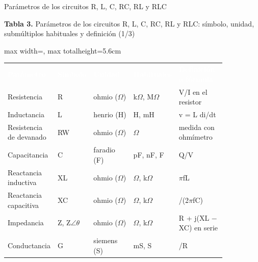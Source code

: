 \documentclass[aspectratio=169,11pt,xcolor={table}]{beamer}
\begin{document}
\begin{frame}{Parámetros de los circuitos R, L, C, RC, RL y RLC}
\begin{center}
{\scriptsize\textbf{Tabla 3.} Parámetros de los circuitos R, L, C, RC, RL y RLC: símbolo, unidad, submúltiplos habituales y definición (1/3)\par}
\vspace{1mm}
\scriptsize
\renewcommand{\arraystretch}{1.35}
\begin{adjustbox}{max width=\linewidth, max totalheight=5.6cm}
\begin{tabular}{>{\raggedright\arraybackslash}p{0.206\linewidth}>{\raggedright\arraybackslash}p{0.074\linewidth}>{\raggedright\arraybackslash}p{0.223\linewidth}>{\raggedright\arraybackslash}p{0.099\linewidth}>{\raggedright\arraybackslash}p{0.247\linewidth}}
\rowcolor{iubnavy} \textcolor{white}{\textbf{Parámetro}} & \textcolor{white}{\textbf{Símbolo}} & \textcolor{white}{\textbf{Unidad}} & \textcolor{white}{\textbf{Habituales}} & \textcolor{white}{\textbf{Definición o fórmula}} \\
Resistencia & R & ohmio (\ensuremath{\Omega}) & k\ensuremath{\Omega}, M\ensuremath{\Omega} & V/I en el resistor \\
\rowcolor{iubfondogris} Inductancia & L & henrio (H) & \textmu{}H, mH & v = L di/dt \\
Resistencia de devanado & RW & ohmio (\ensuremath{\Omega}) & \ensuremath{\Omega} & medida con ohmímetro \\
\rowcolor{iubfondogris} Capacitancia & C & faradio (F) & pF, nF, \textmu{}F & Q/V \\
Reactancia inductiva & XL & ohmio (\ensuremath{\Omega}) & \ensuremath{\Omega}, k\ensuremath{\Omega} & 2\ensuremath{\pi}fL \\
\rowcolor{iubfondogris} Reactancia capacitiva & XC & ohmio (\ensuremath{\Omega}) & \ensuremath{\Omega}, k\ensuremath{\Omega} & 1/(2\ensuremath{\pi}fC) \\
Impedancia & Z, Z\ensuremath{\angle}\ensuremath{\theta} & ohmio (\ensuremath{\Omega}) & \ensuremath{\Omega}, k\ensuremath{\Omega} & R + j(XL \ensuremath{-} XC) en serie \\
\rowcolor{iubfondogris} Conductancia & G & siemens (S) & mS, \textmu{}S & 1/R \\
\bottomrule
\end{tabular}
\end{adjustbox}
\end{center}
\end{frame}
\end{document}
